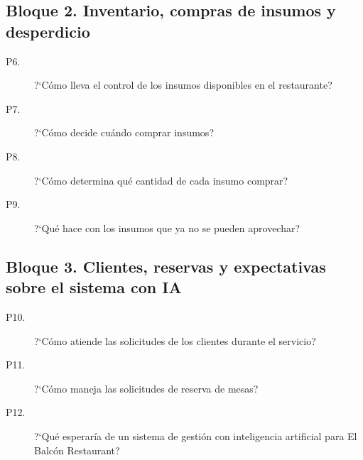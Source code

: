 
\subsection*{Bloque 2. Inventario, compras de insumos y desperdicio}

\begin{description}
  \item[P6.] ?`C\'omo lleva el control de los insumos disponibles en el restaurante?
  \item[P7.] ?`C\'omo decide cu\'ando comprar insumos?
  \item[P8.] ?`C\'omo determina qu\'e cantidad de cada insumo comprar?
  \item[P9.] ?`Qu\'e hace con los insumos que ya no se pueden aprovechar?
\end{description}

\subsection*{Bloque 3. Clientes, reservas y expectativas sobre el sistema con IA}

\begin{description}
  \item[P10.] ?`C\'omo atiende las solicitudes de los clientes durante el servicio?
  \item[P11.] ?`C\'omo maneja las solicitudes de reserva de mesas?
  \item[P12.] ?`Qu\'e esperar\'ia de un sistema de gesti\'on con inteligencia artificial para El Balc\'on Restaurant?
\end{description}

